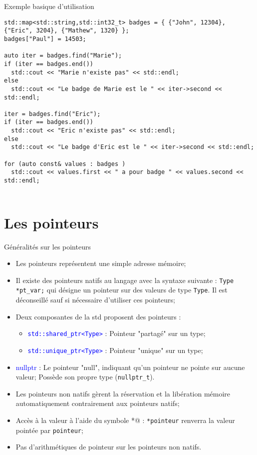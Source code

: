 \documentclass[compress,10pt,aspectratio=169]{beamer}
\begin{document}
  \begin{frame}[fragile]{Exemple basique d'utilisation}
    \scriptsize
  
  \begin{verbatim}
std::map<std::string,std::int32_t> badges = { {"John", 12304}, {"Eric", 3204}, {"Mathew", 1320} };
badges["Paul"] = 14503;
  
auto iter = badges.find("Marie");
if (iter == badges.end())
  std::cout << "Marie n'existe pas" << std::endl;
else
  std::cout << "Le badge de Marie est le " << iter->second << std::endl;
  
iter = badges.find("Eric");
if (iter == badges.end())
  std::cout << "Eric n'existe pas" << std::endl;
else
  std::cout << "Le badge d'Eric est le " << iter->second << std::endl;
  
for (auto const& values : badges )
  std::cout << values.first << " a pour badge " << values.second << std::endl;
  
  \end{verbatim}
  \end{frame}
  
\section{Les pointeurs}

\begin{frame}[fragile]{Généralités sur les pointeurs}
    \scriptsize
  
    \begin{itemize}
  \item Les pointeurs représentent une simple adresse mémoire;
  \item Il existe des pointeurs natifs au langage avec la syntaxe suivante : \texttt{Type *pt_var;} qui désigne un pointeur 
        sur des valeurs de type \texttt{Type}. Il est déconseillé sauf si nécessaire d'utiliser ces pointeurs;
  \item Deux composantes de la std proposent des pointeurs :
  \begin{itemize}
  \scriptsize 
  \item \textcolor{blue}{\texttt{std::shared\_ptr<Type>}} : Pointeur "partagé" sur un type;
  \item \textcolor{blue}{\texttt{std::unique\_ptr<Type>}} : Pointeur "unique" sur un type;
  \end{itemize}
  \item \textcolor{blue}{nullptr} : Le pointeur "null", indiquant qu'un pointeur ne pointe sur aucune valeur; Possède son propre type (\texttt{nullptr_t}).
  \item Les pointeurs non natifs gèrent la réservation et la libération mémoire automatiquement contrairement aux pointeurs natifs;
  \item Accès à la valeur à l'aide du symbole \verb@*@ : \texttt{*pointeur} renverra la valeur pointée par \texttt{pointeur};
  \item Pas d'arithmétiques de pointeur sur les pointeurs non natifs.
  \end{itemize}
  
\end{frame}
\end{document}
